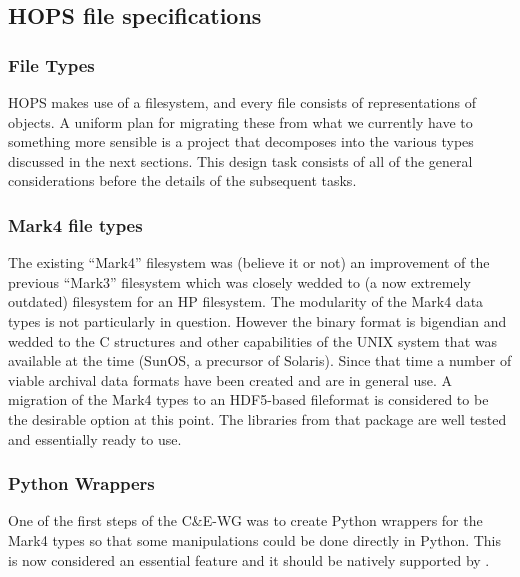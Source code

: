 \subsection{HOPS file specifications}
\label{sec:hopsfiles}

\subsubsection{File Types}
\label{sec:ftypes}
HOPS makes use of a filesystem, and every file consists of representations
of objects.  A uniform plan for migrating these from what we currently have
to something more sensible is a project that decomposes into the various
types discussed in the next sections.  This design task consists of
all of the general considerations before the details of the subsequent tasks.

\subsubsection{Mark4 file types}
\label{sec:mk4types}
The existing ``Mark4'' filesystem was (believe it or not) an improvement
of the previous ``Mark3'' filesystem which was closely wedded to (a now
extremely outdated) filesystem for an HP filesystem.  The modularity of
the Mark4 data types is not particularly in question.  However the binary
format is bigendian and wedded to the C structures and other capabilities
of the UNIX system that was available at the time (SunOS, a precursor of
Solaris).  Since that time a number of viable archival data formats have
been created and are in general use.  A migration of the Mark4 types to
an HDF5-based fileformat is considered to be the desirable option at this
point.  The libraries from that package are well tested and essentially
ready to use.

\subsubsection{Python Wrappers}
\label{sec:pywrap}
One of the first steps of the C\&E-WG was to create Python wrappers for
the Mark4 types so that some manipulations could be done directly in
Python.  This is now considered an essential feature and it should be
natively supported by \nuHOPS.


